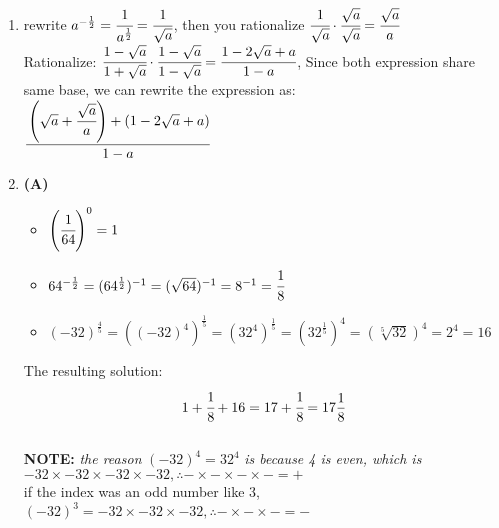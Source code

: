 \begin{multicols}{2}
\begin{enumerate}[label={\arabic*.}]
\begin{tabular}{c|c}
    \end{tabular}
    \item rewrite $a^{-\frac{1}{2}} = \cfrac{1}{a^{\frac{1}{2}}} = \cfrac{1}{\sqrt{a}}$, then you rationalize $ \cfrac{1}{\sqrt{a}} \cdot \cfrac{\sqrt{a}}{\sqrt{a}} = \cfrac{\sqrt{a}}{a}$ \\
     Rationalize: $\cfrac{1-\sqrt{a}}{1+\sqrt{a}} \cdot \cfrac{1-\sqrt{a}}{1-\sqrt{a}} = \cfrac{1-2\sqrt{a} + a}{1-a} $, Since both expression share same base, we can rewrite the expression as: \\
     $\cfrac{\left(\sqrt{a} + \cfrac{\sqrt{a}}{a}\right) + (1-2\sqrt{a} + a) }{1-a}$
    
    
    \item \textbf{(A)}
    \begin{itemize} 
    \item $\left(\cfrac{1}{64}\right)^0 = 1$\\
    \item $64^{-\frac{1}{2}} = (64^{\frac{1}{2}})^{-1} = (\sqrt{64})^{-1}= 8^{-1} = \cfrac{1}{8}$ \\
    \item $(-32)^{\frac{4}{5}} = ((-32)^4)^{\frac{1}{5}} = (32^4)^{\frac{1}{5}} = (32^{\frac{1}{5}})^4 = \left(\sqrt[5]{32}\right)^4 = 2^4 = 16$
    \end{itemize}
    The resulting solution: \\
    $$1 + \cfrac{1}{8} + 16 = 17 + \cfrac{1}{8} = 17\frac{1}{8}$$ \\
    \textbf{NOTE:} \textit{the reason} $(-32)^4 = 32^4$ \textit{ is because 4 is even, which is} $-32 \times -32 \times -32 \times -32, \therefore - \times - \times - \times - = +$  \\
    if the index was an odd number like 3, $(-32)^3 = -32 \times -32 \times -32, \therefore - \times - \times - = -$ 


\end{enumerate}
\end{multicols}
